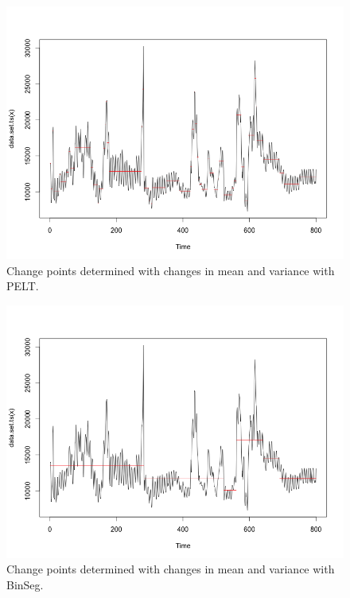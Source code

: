 \documentclass[minf,twoside,singlespacing,parskip,frontabs,notimes,12pt]{infthesis} %
\begin{document}
\begin{figure}[h!]
\begin{center}
\includegraphics[width=\textwidth]{meanvar_pelt}
\end{center}
\caption{Change points determined with changes in mean and variance with PELT.}
\label{pelt-meanvar}
\end{figure}
\begin{figure}[h!]
\begin{center}
\includegraphics[width=\textwidth]{meanvar_binset}
\end{center}
\caption{Change points determined with changes in mean and variance with BinSeg.}
\label{meanvar-binseg}
\end{figure}
\end{document}
